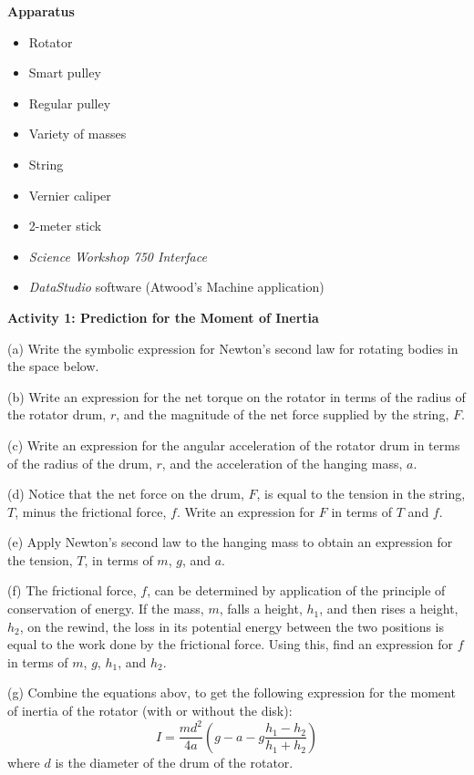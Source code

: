 \textbf{Apparatus}

\begin{itemize}
\item Rotator
\item Smart pulley
\item Regular pulley
\item Variety of masses
\item String
\item Vernier caliper
\item 2-meter stick
\item \textit{Science Workshop 750 Interface}
\item \textit{DataStudio} software (Atwood's Machine application)
\end{itemize}
\textbf{Activity 1: Prediction for the Moment of Inertia} 

(a) Write the symbolic expression for Newton's second law for rotating bodies
in the space below.
\vspace{10mm}

(b) Write an expression for the net torque on the rotator in terms of the radius
of the rotator drum, $r$, and the magnitude of the net force supplied by the string,
$F$.
\vspace{10mm}

(c) Write an expression for the angular acceleration of the rotator drum in
terms of the radius of the drum, $r$, and the acceleration of the hanging mass,
$a$.
\vspace{10mm}

(d) Notice that the net force on the drum, $F$, is equal to the tension in the
string, $T$, minus the frictional force, $f$. Write an expression for 
$F$ in terms
of $T$ and $f$.
\vspace{10mm}

(e) Apply Newton's second law to the hanging mass to obtain an expression for
the tension, $T$, in terms of $m$, $g$, and $a$.
\vspace{20mm}

(f) The frictional force, $f$, can be determined by application of the principle
of conservation of energy. If the mass, $m$, falls a height, \( h_{1} \), and
then rises a height, \( h_{2} \), on the rewind, the loss in its potential
energy between the two positions is equal to the work done by the frictional
force. Using this, find an expression for $f$ in terms of $m$, $g$, \( h_{1} \),
and \( h_{2} \).
\vspace{20mm}

(g) Combine the equations abov, to get the following expression for the moment
of inertia of the rotator (with or without the disk): 
\[
I=\frac{md^{2}}{4a}\left( g-a-g\frac{h_{1}-h_{2}}{h_{1}+h_{2}}\right) \]
where $d$ is the diameter of the drum of the rotator.
\vspace{40mm}

